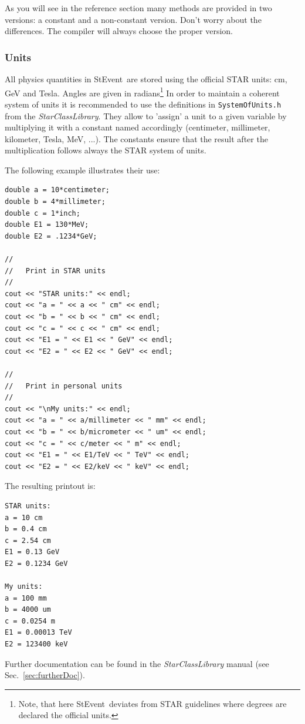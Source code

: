\documentclass[twoside]{article}
\newcommand{\name}[1]{\textsl{#1}}%
\newcommand{\StEvent}{\textsf{StEvent}}
\begin{document}
As you will see in the reference section many methods are provided in
two versions: a constant and a non-constant version. Don't worry about
the differences. The compiler will always choose the proper version.

\subsubsection{Units}
\label{sec:units}
 

All physics quantities in \StEvent\ are stored using the official STAR
units: cm, GeV and Tesla.  Angles are given in radians\footnote{Note,
    that here \StEvent\ deviates from STAR guidelines where degrees
    are declared the official units.}  In order to maintain a coherent
system of units it is recommended to use the definitions in
\texttt{SystemOfUnits.h} from the \name{StarClassLibrary}. They allow
to 'assign' a unit to a given variable by multiplying it with a
constant named accordingly (centimeter, millimeter, kilometer, Tesla,
MeV, ...).  The constants ensure that the result after the
multiplication follows always the STAR system of units.

The following example illustrates their use:
\begin{verbatim}
double a = 10*centimeter;
double b = 4*millimeter;
double c = 1*inch;
double E1 = 130*MeV;
double E2 = .1234*GeV;

//
//   Print in STAR units
//
cout << "STAR units:" << endl;
cout << "a = " << a << " cm" << endl;
cout << "b = " << b << " cm" << endl;
cout << "c = " << c << " cm" << endl;
cout << "E1 = " << E1 << " GeV" << endl;
cout << "E2 = " << E2 << " GeV" << endl;

//
//   Print in personal units
//
cout << "\nMy units:" << endl;
cout << "a = " << a/millimeter << " mm" << endl;
cout << "b = " << b/micrometer << " um" << endl;
cout << "c = " << c/meter << " m" << endl;
cout << "E1 = " << E1/TeV << " TeV" << endl;
cout << "E2 = " << E2/keV << " keV" << endl;
\end{verbatim}
The resulting printout is:
\begin{verbatim}
STAR units:
a = 10 cm
b = 0.4 cm
c = 2.54 cm
E1 = 0.13 GeV
E2 = 0.1234 GeV

My units:
a = 100 mm
b = 4000 um
c = 0.0254 m
E1 = 0.00013 TeV
E2 = 123400 keV
\end{verbatim}
Further documentation can be found in the \name{StarClassLibrary}
manual (see Sec.~\ref{sec:furtherDoc}).\vfill
\end{document}
